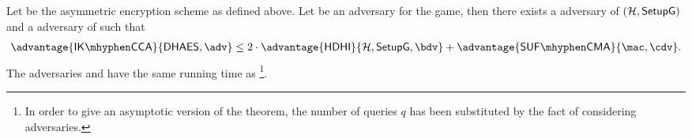 \begin{theorem}\label{th:ik-cca}
    Let \dhaes{} be the asymmetric encryption scheme as defined above. Let \adv{} be an adversary for the \ikcca{} game, then there exists a \hdhi{} adversary \bdv{} of $(\mathcal{H},\mathsf{SetupG})$ and a \sufcma{} adversary \cdv{} of \mac{} such that
    \begin{align*}
        \advantage{\ikcca}{\dhaes, \adv} \leq 2\cdot\advantage{\hdhi}{\hashSet, \groupSetup, \bdv} + \advantage{\sufcma}{\mac, \cdv}.
    \end{align*}
    The adversaries \bdv{} and \cdv{} have the same running time as \adv{}\footnote{In order to give an asymptotic version of the theorem, the number of queries $q$ has been substituted by the fact of considering \ppt{} adversaries.}.
\end{theorem}

